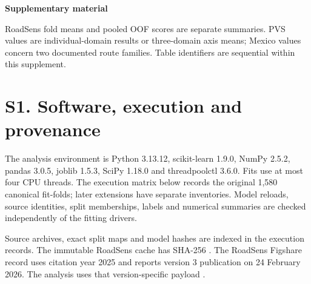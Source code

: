 \begin{center}
{\large\bfseries Supplementary material\par}\medskip
{\bfseries\articletitle\par}\medskip
\ifanonymous\else{\small\authorblock\par}\fi
\end{center}
\medskip
RoadSens fold means and pooled OOF scores are separate summaries. PVS values are individual-domain results or three-domain axis means; Mexico values concern two documented route families. Table identifiers are sequential within this supplement.
\par\medskip
\section*{S1. Software, execution and provenance}
The analysis environment is Python 3.13.12, scikit-learn 1.9.0, NumPy 2.5.2, pandas 3.0.5, joblib 1.5.3, SciPy 1.18.0 and threadpoolctl 3.6.0. Fits use at most four CPU threads. The execution matrix below records the original 1,580 canonical fit-folds; later extensions have separate inventories. Model reloads, source identities, split memberships, labels and numerical summaries are checked independently of the fitting drivers.

Source archives, exact split maps and model hashes are indexed in the execution records. The immutable RoadSens cache has SHA-256 . The RoadSens Figshare record uses citation year 2025 and reports version 3 publication on 24 February 2026. The analysis uses that version-specific payload \citep{roadsensdata}.

